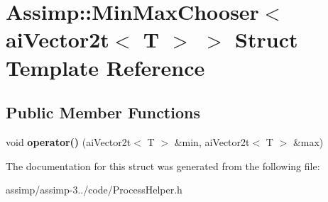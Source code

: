 \hypertarget{struct_assimp_1_1_min_max_chooser_3_01ai_vector2t_3_01_t_01_4_01_4}{\section{Assimp\+:\+:Min\+Max\+Chooser$<$ ai\+Vector2t$<$ T $>$ $>$ Struct Template Reference}
\label{struct_assimp_1_1_min_max_chooser_3_01ai_vector2t_3_01_t_01_4_01_4}
}
\subsection*{Public Member Functions}
\begin{DoxyCompactItemize}
\item 
\hypertarget{struct_assimp_1_1_min_max_chooser_3_01ai_vector2t_3_01_t_01_4_01_4_a3792f95cc76f7bf56951aff42f1d7057}{void {\bfseries operator()} (ai\+Vector2t$<$ T $>$ \&min, ai\+Vector2t$<$ T $>$ \&max)}\label{struct_assimp_1_1_min_max_chooser_3_01ai_vector2t_3_01_t_01_4_01_4_a3792f95cc76f7bf56951aff42f1d7057}

\end{DoxyCompactItemize}


The documentation for this struct was generated from the following file\+:\begin{DoxyCompactItemize}
\item 
assimp/assimp-\/3../code/Process\+Helper.\+h\end{DoxyCompactItemize}
